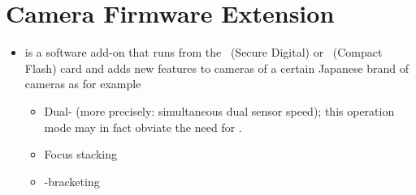 \section[Camera Firmware Extension]{\label{sec:camera-firmware-extension}%
  Camera Firmware Extension}

\begin{itemize}
  \label{app:magiclantern}%
\item
   is a software add-on that runs from the
  ~(Secure Digital) or ~(Compact Flash) card and adds new features to
  cameras of a certain Japanese brand of cameras as for example

  \begin{itemize}
  \item
    Dual- (more precisely: simultaneous dual sensor speed); this operation mode may
    in fact obviate the need for .

  \item
    Focus stacking

  \item
    -bracketing
  \end{itemize}
\end{itemize}



